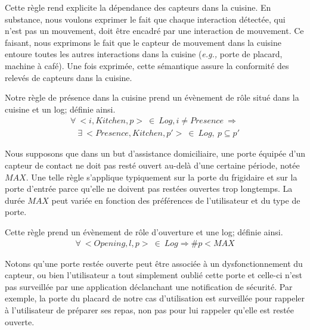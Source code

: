  Cette règle rend explicite la dépendance des capteurs dans la cuisine. En substance, nous voulons exprimer le fait que chaque interaction détectée, qui n'est pas un mouvement, doit être encadré par une interaction de mouvement. Ce faisant, nous exprimons le fait que le capteur de mouvement dans la cuisine entoure toutes les autres interactions dans la cuisine ({\em e.g.,} porte de placard, machine à café). Une fois exprimée, cette sémantique assure la conformité des relevés de capteurs dans la cuisine.

Notre règle de présence dans la cuisine prend un évènement de rôle situé dans la cuisine et un log; définie ainsi. \begin{displaymath}\label{archi:algebra:example}
  \begin{array}{c}
    \forall~<i, Kitchen, p>~\in~Log, i \neq Presence~ \Rightarrow \\
    ~~~~\exists~ <Presence, Kitchen, p'>~\in~Log,~p \subseteq p' 
  \end{array}
\end{displaymath}

 Nous supposons que dans un but d'assistance domiciliaire, une porte équipée d'un capteur de contact ne doit pas resté ouvert au-delà d'une certaine période, notée $MAX$. Une telle règle s'applique typiquement sur la porte du frigidaire et sur la porte d'entrée parce qu'elle ne doivent pas restées ouvertes trop longtemps. La durée $MAX$ peut variée en fonction des préférences de l'utilisateur et du type de porte.

Cette règle prend un évènement de rôle d'ouverture et une log; définie ainsi.
\begin{displaymath}\label{archi:algebra:example2}
  \begin{array}{c}
    \forall~<Opening, l, p>~\in~Log \Rightarrow  \# p < MAX
  \end{array}
\end{displaymath}

Notons qu'une porte restée ouverte peut être associée à un dysfonctionnement du capteur, ou bien l'utilisateur a tout simplement oublié cette porte et celle-ci n'est pas surveillée par une application déclanchant une notification de sécurité. Par exemple, la porte du placard de notre cas d'utilisation est surveillée pour rappeler à l'utilisateur de préparer ses repas, non pas pour lui rappeler qu'elle est restée ouverte.

